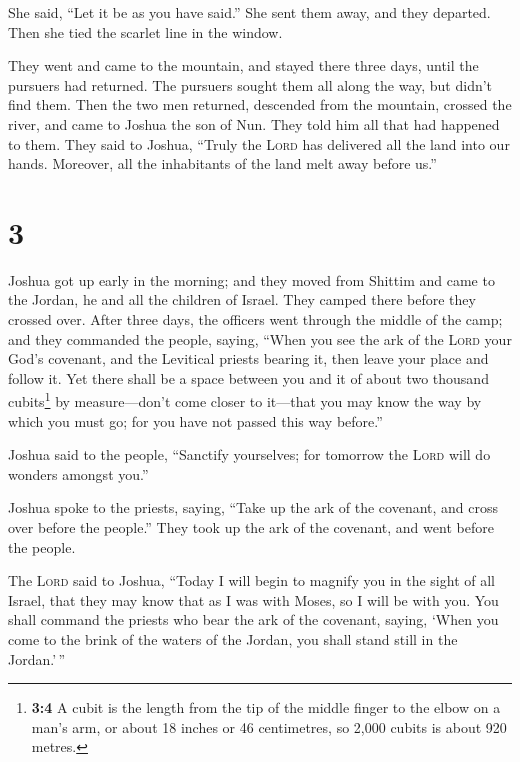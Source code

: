  She said, ``Let it be as you have said.'' She sent them
away, and they departed. Then she tied the scarlet line in the window.

 They went and came to the mountain, and stayed there
three days, until the pursuers had returned. The pursuers sought them
all along the way, but didn't find them.  Then the two
men returned, descended from the mountain, crossed the river, and came
to Joshua the son of Nun. They told him all that had happened to them.
 They said to Joshua, ``Truly the \textsc{Lord} has
delivered all the land into our hands. Moreover, all the inhabitants of
the land melt away before us.''

\hypertarget{section-2}{%
\section{3}\label{section-2}}

 Joshua got up early in the morning; and they moved from
Shittim and came to the Jordan, he and all the children of Israel. They
camped there before they crossed over.  After three days,
the officers went through the middle of the camp;  and
they commanded the people, saying, ``When you see the ark of the
\textsc{Lord} your God's covenant, and the Levitical priests bearing it,
then leave your place and follow it.  Yet there shall be a
space between you and it of about two thousand cubits\footnote{\textbf{3:4}
  A cubit is the length from the tip of the middle finger to the elbow
  on a man's arm, or about 18 inches or 46 centimetres, so 2,000 cubits
  is about 920 metres.} by measure---don't come closer to it---that you
may know the way by which you must go; for you have not passed this way
before.''

 Joshua said to the people, ``Sanctify yourselves; for
tomorrow the \textsc{Lord} will do wonders amongst you.''

 Joshua spoke to the priests, saying, ``Take up the ark of
the covenant, and cross over before the people.'' They took up the ark
of the covenant, and went before the people.

 The \textsc{Lord} said to Joshua, ``Today I will begin to
magnify you in the sight of all Israel, that they may know that as I was
with Moses, so I will be with you.  You shall command the
priests who bear the ark of the covenant, saying, `When you come to the
brink of the waters of the Jordan, you shall stand still in the
Jordan.'\,''


